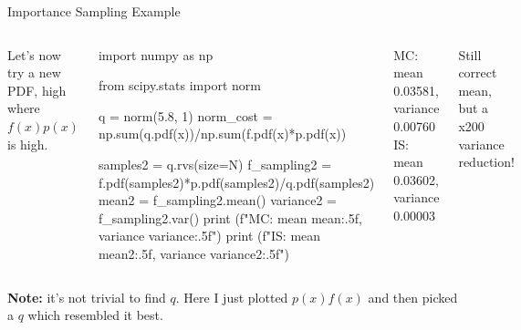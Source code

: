 \documentclass{beamer}
\begin{document}
\begin{frame}[fragile]{Importance Sampling Example}
\begin{columns}
Let's now try a new PDF, high where $f(x)p(x)$ is high.
\begin{ipython}
import numpy as np
		
from scipy.stats import norm

q = norm(5.8, 1)
norm_cost = np.sum(q.pdf(x))/np.sum(f.pdf(x)*p.pdf(x))
		
samples2 = q.rvs(size=N)
f_sampling2 = f.pdf(samples2)*p.pdf(samples2)/q.pdf(samples2)
mean2 = f_sampling2.mean()
variance2 = f_sampling2.var()
print (f"MC: mean {mean:.5f}, variance {variance:.5f}")
print (f"IS: mean {mean2:.5f}, variance {variance2:.5f}")
\end{ipython}
\begin{ioutput}
	
MC: mean 0.03581, variance 0.00760
IS: mean 0.03602, variance 0.00003
\end{ioutput}
\small{Still correct mean, but a x200 variance reduction!}
\begin{center}
	\includegraphics[width=0.7\linewidth]{images/is_distribution}\\
	\includegraphics[width=0.7\linewidth]{images/mc_is}
\end{center}
\end{columns}

\textbf{Note:} it’s not trivial to find $q$. Here I just plotted $p(x)f(x)$ and then picked a $q$ which resembled it best.
\end{frame}
\end{document}
